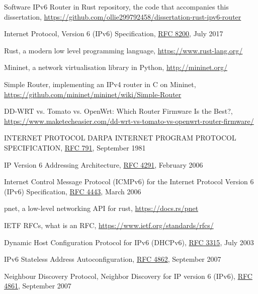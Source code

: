 \documentclass[12pt,a4paper,twoside,openany]{report}
\begin{document}
\begin{thebibliography}{1}

 Software IPv6 Router in Rust repository, the code that accompanies this dissertation, \url{https://github.com/ollie299792458/dissertation-rust-ipv6-router}

 Internet Protocol, Version 6 (IPv6) Specification, \href{https://tools.ietf.org/html/rfc8200}{RFC 8200}, July 2017

 Rust, a modern low level programming language, \url{https://www.rust-lang.org/}

 Mininet, a network virtualisation library in Python, \url{http://mininet.org/}

 Simple Router, implementing an IPv4 router in C on Mininet, \url{https://github.com/mininet/mininet/wiki/Simple-Router}

 DD-WRT vs. Tomato vs. OpenWrt: Which Router Firmware Is the Best?, \url{https://www.maketecheasier.com/dd-wrt-vs-tomato-vs-openwrt-router-firmware/}

 INTERNET PROTOCOL DARPA INTERNET PROGRAM PROTOCOL SPECIFICATION, \href{https://tools.ietf.org/html/rfc791}{RFC 791}, September 1981

 IP Version 6 Addressing Architecture, \href{https://tools.ietf.org/html/rfc4291}{RFC 4291}, February 2006

 Internet Control Message Protocol (ICMPv6) for the Internet Protocol Version 6 (IPv6) Specification, \href{https://tools.ietf.org/html/rfc4443}{RFC 4443}, March 2006

 pnet, a low-level networking API for rust, \url{https://docs.rs/pnet}

 IETF RFCs, what is an RFC, \url{https://www.ietf.org/standards/rfcs/}

 Dynamic Host Configuration Protocol for IPv6 (DHCPv6), \href{https://tools.ietf.org/html/rfc3315}{RFC 3315}, July 2003

 IPv6 Stateless Address Autoconfiguration, \href{https://tools.ietf.org/html/rfc4862}{RFC 4862}, September 2007

 Neighbour Discovery Protocol, Neighbor Discovery for IP version 6 (IPv6), \href{https://tools.ietf.org/html/rfc4861}{RFC 4861}, September 2007


\end{thebibliography}
\end{document}
